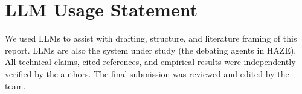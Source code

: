 \documentclass[10pt]{article}
\begin{document}
\section*{LLM Usage Statement}

We used LLMs to assist with drafting, structure, and literature framing of this report.
LLMs are also the system under study (the debating agents in HAZE). All technical claims,
cited references, and empirical results were independently verified by the authors. The
final submission was reviewed and edited by the team.
\end{document}

